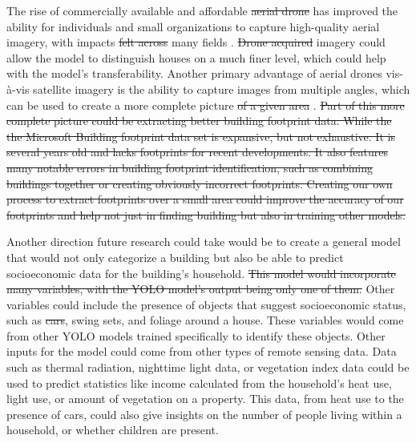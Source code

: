 \documentclass[conference,]{IEEEtran}
\providecommand{\DIFaddtex}[1]{{\protect\color{blue}\uwave{#1}}} %
\providecommand{\DIFdeltex}[1]{{\protect\color{red}\sout{#1}}} %
\providecommand{\DIFaddbegin}{} %
\providecommand{\DIFaddend}{} %
\providecommand{\DIFdelbegin}{} %
\providecommand{\DIFdelend}{} %
\providecommand{\DIFadd}[1]{\texorpdfstring{\DIFaddtex{#1}}{#1}} %
\providecommand{\DIFdel}[1]{\texorpdfstring{\DIFdeltex{#1}}{}} %
\providecommand{\DIFscaledelfig}{0.5}
\newlength{\DIFdelgraphicswidth} %
\newlength{\DIFdelgraphicsheight} %
\providecommand{\DIFaddincludegraphics}[2][]{{\color{blue}\fbox{\DIFOincludegraphics[#1]{#2}}}} %
\providecommand{\DIFdelincludegraphics}[2][]{%
\sbox{\DIFdelgraphicsbox}{\DIFOincludegraphics[#1]{#2}}%
\settoboxwidth{\DIFdelgraphicswidth}{\DIFdelgraphicsbox} %
\settoboxtotalheight{\DIFdelgraphicsheight}{\DIFdelgraphicsbox} %
\scalebox{\DIFscaledelfig}{%
\parbox[b]{\DIFdelgraphicswidth}{\usebox{\DIFdelgraphicsbox}\\[-\baselineskip] \rule{\DIFdelgraphicswidth}{0em}}\llap{\resizebox{\DIFdelgraphicswidth}{\DIFdelgraphicsheight}{%
\setlength{\unitlength}{\DIFdelgraphicswidth}%
\begin{picture}(1,1)%
\thicklines\linethickness{2pt} %
{\color[rgb]{1,0,0}\put(0,0){\framebox(1,1){}}}%
{\color[rgb]{1,0,0}\put(0,0){\line( 1,1){1}}}%
{\color[rgb]{1,0,0}\put(0,1){\line(1,-1){1}}}%
\end{picture}%
}\hspace*{3pt}}} %
} %
\DeclareRobustCommand{\DIFaddbegin}{\DIFOaddbegin \let\includegraphics\DIFaddincludegraphics} %
\DeclareRobustCommand{\DIFaddend}{\DIFOaddend \let\includegraphics\DIFOincludegraphics} %
\DeclareRobustCommand{\DIFdelbegin}{\DIFOdelbegin \let\includegraphics\DIFdelincludegraphics} %
\DeclareRobustCommand{\DIFdelend}{\DIFOaddend \let\includegraphics\DIFOincludegraphics} %
\begin{document}
\DIFaddend The rise of commercially available and affordable \DIFdelbegin \DIFdel{aerial
drone }\DIFdelend \DIFaddbegin \DIFadd{UAVs }\DIFaddend has improved the
ability for individuals and small organizations to capture high-quality
aerial imagery, with impacts \DIFdelbegin \DIFdel{felt across }\DIFdelend \DIFaddbegin \DIFadd{in }\DIFaddend many fields
\autocite{colomina_unmanned_2014,watts_unmanned_2012}. \DIFdelbegin \DIFdel{Drone
acquired }\DIFdelend \DIFaddbegin \DIFadd{UAV-acquired
}\DIFaddend imagery could allow the model to distinguish houses on a much finer
level, which could help with the model's transferability. Another
primary advantage of aerial drones vis-à-vis satellite imagery is the
ability to capture images from multiple angles, which can be used to
create a more complete picture \DIFdelbegin \DIFdel{of a given area
}\DIFdelend \DIFaddbegin \DIFadd{and even a 3D model
}\DIFaddend \autocite{berrettLargeScaleRealityModeling2021}.
\DIFdelbegin \DIFdel{Part of this more
complete picture could be extracting better building footprint data.
While the the Microsoft Building footprint data set is expansive, but
not exhaustive. It is several years old and lacks footprints for recent
developments. It also features many notable errors in building footprint
identification, such as combining buildings together or creating
obviously incorrect footprints. Creating our own process to extract
footprints over a small area could improve the accuracy of our
footprints and help not just in finding building but also in training
other models.
}\DIFdelend 

Another direction future research could take would be to create a
general model that would not only categorize a building but also be able
to predict socioeconomic data for the building's household. \DIFdelbegin \DIFdel{This model
would incorporate many variables, with the YOLO model's output being
only one of them. }\DIFdelend Other
variables could include the presence of objects that suggest
socioeconomic status, such as \DIFdelbegin \DIFdel{cars}\DIFdelend \DIFaddbegin \DIFadd{vehicles}\DIFaddend , swing sets, and foliage around a
house. These variables would come from other YOLO models trained
specifically to identify these objects. Other inputs for the model could
come from other types of remote sensing data. Data such as thermal
radiation, nighttime light data, or vegetation index data could be used
to predict statistics like income calculated from the household's heat
use, light use, or amount of vegetation on a property. This data, from
heat use to the presence of cars, could also give insights on the number
of people living within a household, or whether children are present.
\DIFdelbegin %
\end{document}
